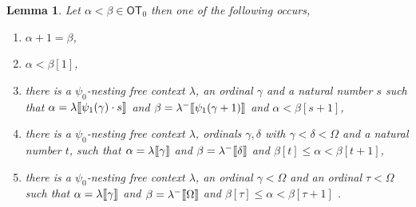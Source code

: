 \documentclass{amsart}
\theoremstyle{plain}
\theoremstyle{plain}
\newtheorem{lemma}[theorem]{Lemma}
\def\scbrl{[\hspace{-.14em}[}
\def\scbrr{]\hspace{-.14em}]}
\def\scbr#1{\scbrl#1\scbrr}
\newcommand\OT{\mathsf{OT}}
\newcommand{\Om}{{\Omega}}
\newcommand{\al}{{\alpha}}
\newcommand{\be}{{\beta}}
\newcommand{\ga}{\gamma}
\newcommand{\de}{\delta}
\newcommand{\la}{\lambda}
\def\scbrl{[\hspace{-.14em}[}
\def\scbrr{]\hspace{-.14em}]}
\def\scbr#1{\scbrl#1\scbrr}
\begin{document}
\begin{lemma}\label{lm:Context1}
Let $\al<\be \in \OT_0$ then one of the following occurs,
\begin{enumerate}
    \item $\al+1=\be$,
    \item $\al<\be[1]$,
    \item there is a $\psi_0$-nesting free context $\la$, an ordinal $\ga$ and a natural number $s$  such that $\al = \la\scbr{\psi_1(\ga) \cdot s}$ and $\be = \la^-\scbr{\psi_1(\ga+1)}$ and $\al<\be[s+1]$,
    \item there is a $\psi_0$-nesting free context $\la$, ordinals $\ga,\de$ with $\ga<\de< \Om$ and a natural number $t$, such that  $ \al=\la\scbr{\ga}$ and $\be=\la^-\scbr{\de}$ and	 $\be[t] \leq \al < \be[t+1]$,
    \item there is a $\psi_0$-nesting free context $\la$, an ordinal $\ga<\Om$ and an ordinal $\tau<\Om$ such that  $ \al=\la\scbr{\ga}$ and  $\be=\la^-\scbr{\Om}$ and $ \be[\tau] \leq \al<\be[\tau+1]$ .
\end{enumerate}
\end{lemma}
\end{document}
